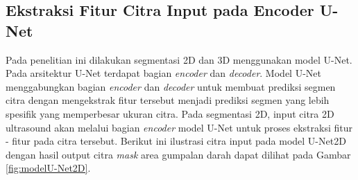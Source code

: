 {%


\subsection{Ekstraksi Fitur Citra Input pada Encoder U-Net}
Pada penelitian ini dilakukan segmentasi 2D dan 3D menggunakan model U-Net. Pada arsitektur U-Net terdapat bagian \textit{encoder} dan \textit{decoder}. Model U-Net menggabungkan bagian \textit{encoder} dan \textit{decoder} untuk membuat prediksi segmen citra dengan mengekstrak fitur tersebut menjadi prediksi segmen yang lebih spesifik yang memperbesar ukuran citra. Pada segmentasi 2D, input citra 2D ultrasound akan melalui bagian \textit{encoder} model U-Net untuk proses ekstraksi fitur - fitur pada citra tersebut. Berikut ini ilustrasi citra input pada model U-Net2D dengan hasil output citra \textit{mask} area gumpalan darah dapat dilihat pada Gambar \ref{fig:modelU-Net2D}.

}
